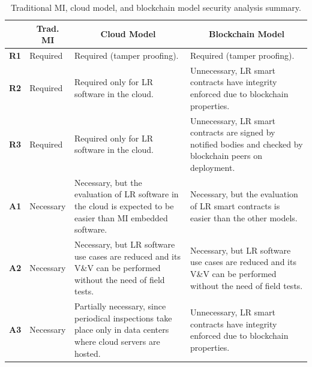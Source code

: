 \documentclass[journal]{IEEEtran}
\begin{document}
\begin{table}[t]
\centering
\caption{Traditional MI, cloud model, and blockchain model security analysis summary.}
\label{t:sec_analysis}
\begin{tabularx}{1\textwidth}{|c|l|X|X|}
\hline
                                  & \multicolumn{1}{c|}{\textbf{Trad. MI}} & \multicolumn{1}{c|}{\textbf{Cloud Model}}                                                                             & \multicolumn{1}{c|}{\textbf{Blockchain Model}}                                                               \\ \hline
\multicolumn{1}{|c|}{\textbf{R1}} & Required                                     & Required (tamper proofing).                                                                                           & Required (tamper proofing).                                                                                  \\ \hline
\multicolumn{1}{|c|}{\textbf{R2}} & Required                                     & Required only for LR software in the cloud.                                                                           & Unnecessary, LR smart contracts have integrity enforced due to blockchain properties.                        \\ \hline
\multicolumn{1}{|c|}{\textbf{R3}} & Required                                     & Required only for LR software in the cloud.                                                                           & Unnecessary, LR smart contracts are signed by notified bodies and checked by blockchain peers on deployment. \\ \hline
\textbf{A1}                       & Necessary                                    & Necessary, but the evaluation of LR software in the cloud is expected to be easier than MI embedded software.         & Necessary, but the evaluation of LR smart contracts is easier than the other models.                         \\ \hline
\textbf{A2}                       & Necessary                                    & Necessary, but LR software use cases are reduced and its V\&V can be performed without the need of field tests.               & Necessary, but LR software use cases are reduced and its V\&V can be performed without the need of field tests.      \\ \hline
\textbf{A3}                       & Necessary                                    & Partially necessary, since periodical inspections take place only in data centers where cloud servers are hosted. & Unnecessary, LR smart contracts have integrity enforced due to blockchain properties.                        \\ \hline
\end{tabularx}
\end{table}
\end{document}
